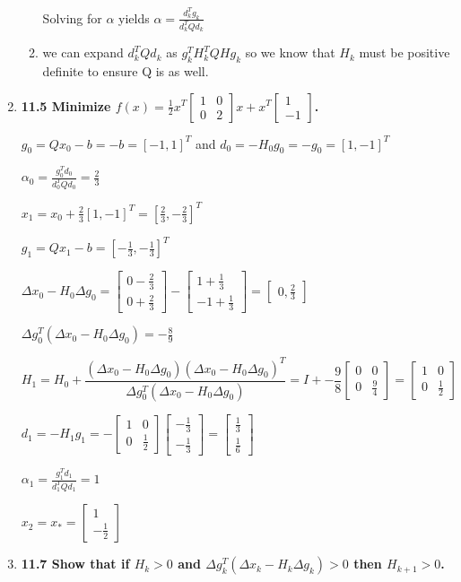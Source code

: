 \documentclass[10pt,a4paper]{article}
\newcommand\m[1]{\begin{bmatrix}#1\end{bmatrix}}
\begin{document}
\begin{enumerate}
\begin{enumerate}
        Solving for $\alpha$ yields $\alpha  = \frac{d_k^Tg_k}{d_k^TQd_k}$

        \item we can expand $d_k^TQd_k$ as $g_k^TH_k^TQHg_k$ so we know that $H_k$ must be positive definite to ensure Q is as well.
    \end{enumerate}

    \item \textbf{11.5 Minimize $f(x) = \frac{1}{2} x^T \m{1 & 0 \\0 & 2} x + x^T\m{1 \\ -1}$.}
    
    $g_0 = Qx_0 -b = -b = [-1, 1]^T$ and $d_0 = -H_0g_0 = -g_0 = [1, -1]^T$

    $\alpha_0 = \frac{g_0^Td_0}{d_0^TQd_0} = \frac{2}{3}$

    $x_1 = x_0 + \frac{2}{3}[1, -1]^T = [\frac{2}{3}, -\frac{2}{3}]^T$

    $g_1 = Qx_1 -b = [-\frac{1}{3}, -\frac{1}{3}]^T$

    $\Delta x_0 - H_0 \Delta g_0 = \begin{bmatrix}  0-\frac{2}{3} \\ 0 +\frac{2}{3}\end{bmatrix} - \begin{bmatrix} 1 + \frac{1}{3} \\ -1 + \frac{1}{3} \end{bmatrix} = \begin{bmatrix}0, \frac{2}{3}\end{bmatrix}$

    $\Delta g_0^T(\Delta x_0 - H_0 \Delta g_0) =  - \frac{8}{9}$
    
    $$H_1 = H_0 + \frac{(\Delta x_0 - H_0 \Delta g_0)(\Delta x_0 - H_0 \Delta g_0)^T}{\Delta g_0^T(\Delta x_0 - H_0 \Delta g_0)} = I + -\frac{9}{8} \m{0 & 0 \\ 0 & \frac{9}{4}} = \m{1 & 0 \\0 & \frac{1}{2}}$$

    $d_1 = -H_1g_1 =  - \m{1 & 0 \\0 & \frac{1}{2}} \m{-\frac{1}{3} \\ -\frac{1}{3}} = \m{\frac{1}{3} \\ \frac{1}{6}}$

    $\alpha_1 = \frac{g_1^Td_1}{d_1^TQd_1} = 1$

    $x_2 = x_* = \m{1 \\ -\frac{1}{2}}$
    
    \item \textbf{11.7 Show that if $H_k > 0$ and $\Delta g_k^T(\Delta x_k - H_k \Delta g_k) > 0$ then $H_{k+1} > 0$.}
   

\end{enumerate}
\end{document}
